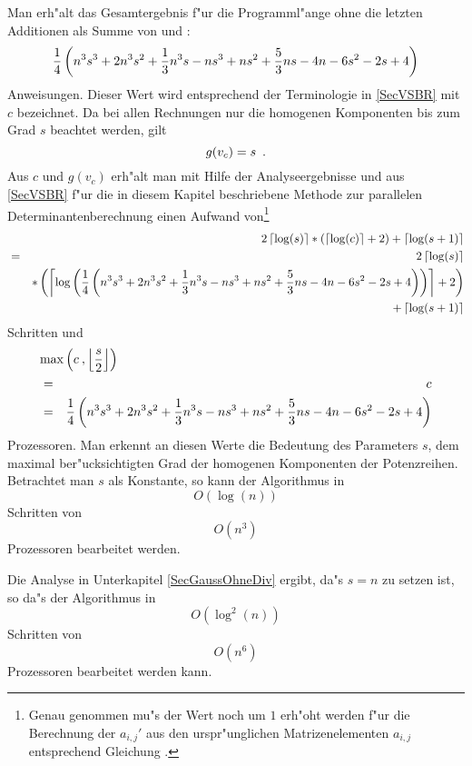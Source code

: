 Man erh"alt das Gesamtergebnis
f"ur die Programml"ange ohne die letzten Additionen als
Summe von  und :
\[ %
   \frac{1}{4} 
   \lb
       n^3 s^3 + 2 n^3 s^2 + \frac{1}{3}n^3 s - n s^3 + n s^2 + 
       \frac{5}{3}n s - 4 n - 6 s^2 - 2 s + 4
   \rb
\]
Anweisungen. Dieser Wert wird entsprechend der Terminologie in
\ref{SecVSBR} mit $c$ bezeichnet. Da bei allen Rechnungen nur die
homogenen Komponenten bis zum Grad $s$ beachtet werden, gilt
\[ g(v_c) = s \mbox{\hspace{0.5em}.} \]
Aus $c$ und $g(v_c)$ erh"alt man mit Hilfe der Analyseergebnisse
 und  aus
\ref{SecVSBR} f"ur die in diesem Kapitel beschriebene Methode zur
parallelen Determinantenberechnung einen Aufwand 
von\footnote{Genau genommen mu"s der Wert noch um $1$ erh"oht werden 
f"ur die Berechnung der $a_{i,j}'$ aus den urspr"unglichen 
Matrizenelementen $a_{i,j}$ entsprechend Gleichung 
.}
\begin{eqnarray*}
    & & 2\left\lceil \log(s) \right\rceil * (\left\lceil \log(c) \right\rceil + 2) + \left\lceil \log(s+1) \right\rceil \\
    & = &
        2\left\lceil \log(s) \right\rceil \\
    & &
        * \left(
            \left\lceil
            \log\left(
   \frac{1}{4} 
   \left(
       n^3 s^3 + 2 n^3 s^2 + \frac{1}{3}n^3 s - n s^3 + n s^2 + 
       \frac{5}{3}n s - 4 n - 6 s^2 - 2 s + 4
   \right)
            \right)
            \right\rceil + 2
        \right) \\
    & & + \left\lceil \log(s+1) \right\rceil
\end{eqnarray*}
Schritten und
\begin{eqnarray*}
  \lefteqn{ \max \lb c \: , \lf \frac{s}{2} \rf \rb } \\
  & = & c \\
  & = &
   \frac{1}{4}
   \lb
       n^3 s^3 + 2 n^3 s^2 + \frac{1}{3}n^3 s - n s^3 + n s^2 +
       \frac{5}{3}n s - 4 n - 6 s^2 - 2 s + 4
   \rb
\end{eqnarray*}
Prozessoren. Man erkennt an diesen Werte die Bedeutung des Parameters
$s$, dem maximal ber"ucksichtigten Grad der homogenen Komponenten der
Potenzreihen. Betrachtet man $s$ als Konstante, so kann der Algorithmus in
\[ O(\log(n)) \] Schritten von \[ O(n^3) \] Prozessoren bearbeitet werden.

Die Analyse in Unterkapitel \ref{SecGaussOhneDiv} ergibt, da"s $s=n$ zu
setzen ist, so da"s der Algorithmus in
\[ O(\log^2(n)) \] Schritten von \[ O(n^6) \] Prozessoren bearbeitet
werden kann.

